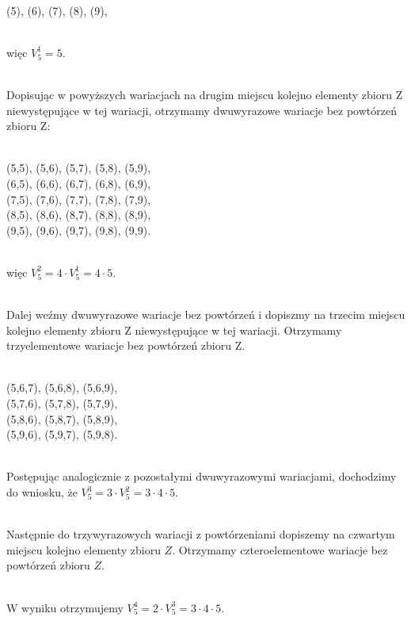 \documentclass[polish,10pt]{article}
\begin{document}
\hspace{1cm}\\(5), (6), (7), (8), (9),

\hspace{1cm}\\więc $V^1_5 = 5$.

\hspace{1cm}\\Dopisując w powyższych wariacjach na drugim miejscu kolejno elementy zbioru Z niewystępujące w tej wariacji, otrzymamy dwuwyrazowe wariacje bez powtórzeń zbioru Z:

\hspace{1cm}\\(5,5), (5,6), (5,7), (5,8), (5,9),
\\(6,5), (6,6), (6,7), (6,8), (6,9),
\\(7,5), (7,6), (7,7), (7,8), (7,9),
\\(8,5), (8,6), (8,7), (8,8), (8,9),
\\(9,5), (9,6), (9,7), (9,8), (9,9).

\hspace{1cm}\\ więc $V^2_5 = 4 \cdot V^1_5 = 4\cdot5$.

\hspace{1cm}\\Dalej weźmy dwuwyrazowe wariacje bez powtórzeń i dopiszmy na trzecim miejscu kolejno elementy zbioru Z niewystępujące w tej wariacji. Otrzymamy trzyelementowe wariacje bez powtórzeń zbioru Z.

\hspace{1cm}\\(5,6,7), (5,6,8), (5,6,9),
\\(5,7,6), (5,7,8), (5,7,9), 
\\(5,8,6), (5,8,7), (5,8,9), 
\\(5,9,6), (5,9,7), (5,9,8). 


\hspace{1cm}\\Postępując analogicznie z pozostałymi dwuwyrazowymi wariacjami, dochodzimy do wniosku, że $V^3_5 = 3 \cdot V^2_5 = 3\cdot4\cdot5$.

\hspace{1cm}\\Następnie do trzywyrazowych wariacji z powtórzeniami dopiszemy na czwartym miejscu kolejno elementy zbioru $Z$. Otrzymamy czteroelementowe wariacje bez powtórzeń zbioru $Z$.

\hspace{1cm}\\W wyniku otrzymujemy $V^4_5 = 2\cdot V^3_5 = 3\cdot4\cdot5$.
\end{document}
